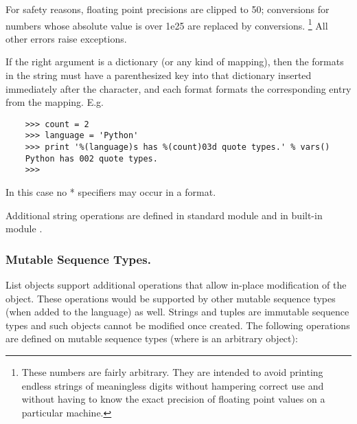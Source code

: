 For safety reasons, floating point precisions are clipped to 50;
 conversions for numbers whose absolute value is over 1e25
are replaced by  conversions.%
\footnote{These numbers are fairly arbitrary.  They are intended to
avoid printing endless strings of meaningless digits without hampering
correct use and without having to know the exact precision of floating
point values on a particular machine.}
All other errors raise exceptions.

If the right argument is a dictionary (or any kind of mapping), then
the formats in the string must have a parenthesized key into that
dictionary inserted immediately after the \code{\%} character, and
each format formats the corresponding entry from the mapping.  E.g.
\begin{verbatim}
    >>> count = 2
    >>> language = 'Python'
    >>> print '%(language)s has %(count)03d quote types.' % vars()
    Python has 002 quote types.
    >>> 
\end{verbatim}
In this case no * specifiers may occur in a format.

Additional string operations are defined in standard module
 and in built-in module .

\subsubsection{Mutable Sequence Types.}

List objects support additional operations that allow in-place
modification of the object.
These operations would be supported by other mutable sequence types
(when added to the language) as well.
Strings and tuples are immutable sequence types and such objects cannot
be modified once created.
The following operations are defined on mutable sequence types (where
 is an arbitrary object):

